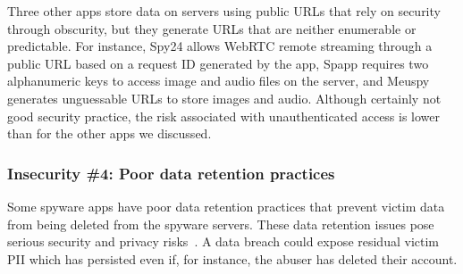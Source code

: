 \documentclass[sigconf,balance=false]{acmart}
\newcommand{\sumanth}[1]{\textcolor{violet}{\noindent[SR: #1]}}
\newcommand{\geoff}[1]{\textcolor{purple}{\noindent[GV: #1]}}
\newcommand{\sumanth}[1]{}
\newcommand{\geoff}[1]{}
\begin{document}

Three other apps store data on servers using public URLs that rely on
security through obscurity, but they generate URLs that are neither
enumerable or predictable.  For instance, Spy24 allows WebRTC remote
streaming through a public URL based on a request ID generated by the
app, Spapp requires two alphanumeric keys to access image and audio
files on the server, and Meuspy generates unguessable URLs to
store images and audio.  Although certainly not good security
practice, the risk associated with unauthenticated access is lower
than for the other apps we discussed.





\subsubsection*{Insecurity \#4: Poor data retention practices}


Some spyware apps have poor data retention practices that prevent
victim data from being deleted from the spyware servers. These data retention issues pose serious security and privacy risks~\cite{santhanam2022scraping}. A data breach could expose residual victim PII which has persisted even if, for instance, the abuser has deleted their account.
\end{document}
